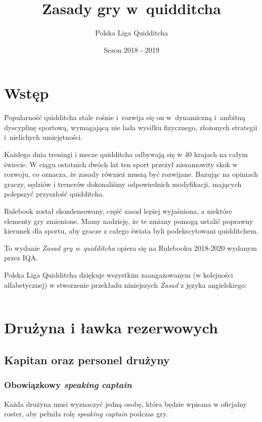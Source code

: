 \documentclass[11pt,a4paper]{article}
\title{Zasady gry w~quidditcha}
\author{Polska Liga Quidditcha}
\date{Sezon 2018 - 2019}
\newcommand{\psection}[1]{
  \section*{#1}
  \addcontentsline{toc}{section}{#1}
}
\newcommand\image[2]{
	\newgeometry{left=0cm,top=#2}
	\texttt{[image: \#1]}
	\restoregeometry
}
\begin{document}
\maketitle

\setlength{\parskip}{0ex}

\tableofcontents

\setlength{\parskip}{1ex plus 0.5ex minus 0.2ex}

\newpage

\psection{Wstęp}

Popularność quidditcha stale rośnie i~rozwija się on w~dynamiczną i~ambitną dyscyplinę sportową,
wymagającą nie lada wysiłku fizycznego,
złożonych strategii i~nielichych umiejętności.

Każdego dnia treningi i mecze quidditcha odbywają się w 40 krajach na całym świecie.
W ciągu ostatnich dwóch lat ten sport przeżył niesamowity skok w rozwoju, co oznacza,
że zasady również muszą być rozwijane. Bazując na opiniach graczy, sędziów i trenerów
dokonaliśmy odpowiednich modyfikacji, mających polepszyć przyszłość quidditcha.

Rulebook został skondensowany, część zasad lepiej wyjaśniona, a niektóre elementy gry
zmienione. Mamy nadzieję, że te zmiany pomogą ustalić poprawny kierunek dla sportu, aby gracze
z całego świata byli podekscytowani quidditchem.

To wydanie \emph{Zasad gry w~quidditcha} opiera się na Rulebooku 2018-2020 wydanym przez IQA.

Polska Liga Quidditcha dziękuje wszystkim zaangażowanym (w kolejności alfabetycznej) w stworzenie przekładu niniejszych \emph{Zasad} z języka angielskiego:
\begin{center}
	\begin{tabular}{c c}

	\end{tabular}
\end{center}

\pagebreak

\section{Drużyna i ławka rezerwowych}

\subsection{Kapitan oraz personel drużyny}

\subsubsection{Obowiązkowy \emph{speaking captain}}
Każda drużyna musi wyznaczyć jedną osobę, która będzie
wpisana w oficjalny roster, aby pełniła rolę
\emph{speaking captain} podczas gry.
\end{document}
